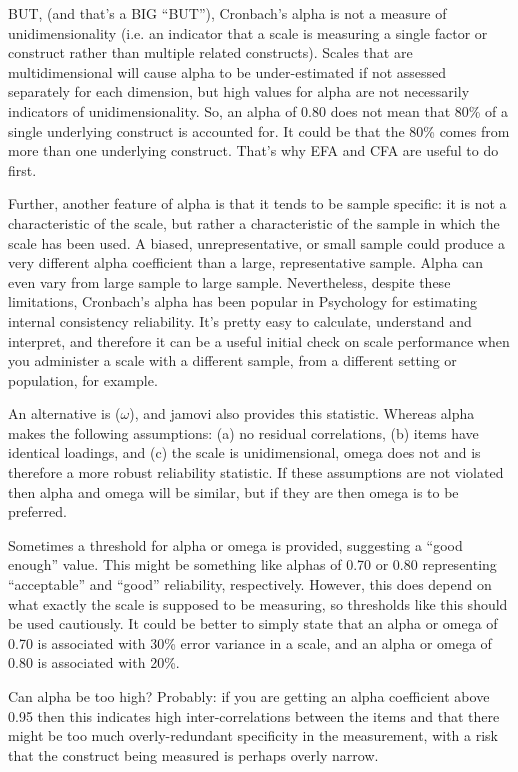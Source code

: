 BUT, (and that’s a BIG “BUT”), Cronbach’s alpha is not a measure of unidimensionality (i.e. an indicator that a scale is measuring a single factor or construct rather than multiple related constructs). Scales that are multidimensional will cause alpha to be under-estimated if not assessed separately for each dimension, but high values for alpha are not necessarily indicators of unidimensionality. So, an alpha of 0.80 does not mean that 80\% of a single underlying construct is accounted for. It could be that the 80\% comes from more than one underlying construct. That’s why EFA and CFA are useful to do first.

Further, another feature of alpha is that it tends to be sample specific: it is not a characteristic of the scale, but rather a characteristic of the sample in which the scale has been used. A biased, unrepresentative, or small sample could produce a very different alpha coefficient than a large, representative sample. Alpha can even vary from large sample to large sample. Nevertheless, despite these limitations, Cronbach’s alpha has been popular in Psychology for estimating internal consistency reliability. It’s pretty easy to calculate, understand and interpret, and therefore it can be a useful initial check on scale performance when you administer a scale with a different sample, from a different setting or population, for example. 

An alternative is  ($\omega$), and jamovi also provides this statistic. Whereas alpha makes the following assumptions: (a) no residual correlations, (b) items have identical loadings, and (c) the scale is unidimensional, omega does not and is therefore a more robust reliability statistic. If these assumptions are not violated then alpha and omega will be similar, but if they are then omega is to be preferred. 

Sometimes a threshold for alpha or omega is provided, suggesting a “good enough” value. This might be something like alphas of 0.70 or 0.80 representing “acceptable” and “good” reliability, respectively. However, this does depend on what exactly the scale is supposed to be measuring, so thresholds like this should be used cautiously. It could be better to simply state that an alpha or omega of 0.70 is associated with 30\% error variance in a scale, and an alpha or omega of 0.80 is associated with 20\%.

Can alpha be too high? Probably: if you are getting an alpha coefficient above 0.95 then this indicates high inter-correlations between the items and that there might be too much overly-redundant specificity in the measurement, with a risk that the construct being measured is perhaps overly narrow. 

